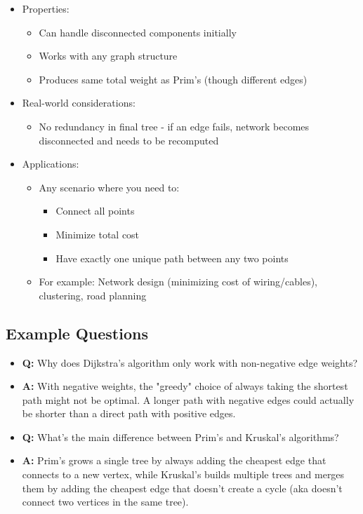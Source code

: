 \documentclass[11pt,a4paper]{article}
\begin{document}
\begin{multicols}{2}
\begin{itemize}
    \item Properties:
    \begin{itemize}
        \item Can handle disconnected components initially
        \item Works with any graph structure
        \item Produces same total weight as Prim's (though different edges)
    \end{itemize}
    \item Real-world considerations:
    \begin{itemize}
        \item No redundancy in final tree - if an edge fails, network becomes disconnected and needs to be recomputed
    \end{itemize}
    \item Applications:
    \begin{itemize}
        \item Any scenario where you need to:
        \begin{itemize}
            \item Connect all points
            \item Minimize total cost
            \item Have exactly one unique path between any two points
        \end{itemize}
        \item For example: Network design (minimizing cost of wiring/cables), clustering, road planning
    \end{itemize}
\end{itemize}

\subsection{Example Questions}
\begin{itemize}
    \item \textbf{Q:} Why does Dijkstra's algorithm only work with non-negative edge weights?
    \item \textbf{A:} With negative weights, the "greedy" choice of always taking the shortest path might not be optimal. A longer path with negative edges could actually be shorter than a direct path with positive edges.

    \item \textbf{Q:} What's the main difference between Prim's and Kruskal's algorithms?
    \item \textbf{A:} Prim's grows a single tree by always adding the cheapest edge that connects to a new vertex, while Kruskal's builds multiple trees and merges them by adding the cheapest edge that doesn't create a cycle (aka doesn't connect two vertices in the same tree).


\end{itemize}
\end{multicols}
\end{document}
